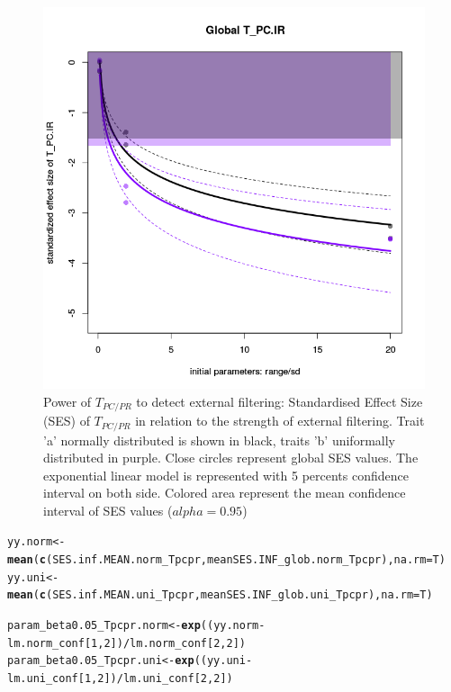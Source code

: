 \documentclass[12pt]{article}\usepackage[]{graphicx}\usepackage[]{color}
\makeatletter
\def\maxwidth{ %
  \ifdim\Gin@nat@width>\linewidth
    \linewidth
  \else
    \Gin@nat@width
  \fi
}
\newcommand{\hlnum}[1]{\textcolor[rgb]{0.686,0.059,0.569}{#1}}%
\newcommand{\hlopt}[1]{\textcolor[rgb]{0,0,0}{#1}}%
\newcommand{\hlstd}[1]{\textcolor[rgb]{0.345,0.345,0.345}{#1}}%
\newcommand{\hlkwb}[1]{\textcolor[rgb]{0.69,0.353,0.396}{#1}}%
\newcommand{\hlkwc}[1]{\textcolor[rgb]{0.333,0.667,0.333}{#1}}%
\newcommand{\hlkwd}[1]{\textcolor[rgb]{0.737,0.353,0.396}{\textbf{#1}}}%
\newenvironment{kframe}{%
 \def\at@end@of@kframe{}%
 \ifinner\ifhmode%
  \def\at@end@of@kframe{\end{minipage}}%
  \begin{minipage}{\columnwidth}%
 \fi\fi%
 \def\FrameCommand##1{\hskip\@totalleftmargin \hskip-\fboxsep
 \colorbox{shadecolor}{##1}\hskip-\fboxsep
     \hskip-\linewidth \hskip-\@totalleftmargin \hskip\columnwidth}%
 \MakeFramed {\advance\hsize-\width
   \@totalleftmargin\z@ \linewidth\hsize
   \@setminipage}}%
 {\par\unskip\endMakeFramed%
 \at@end@of@kframe}
\newenvironment{knitrout}{}{} %
\makeatother
\begin{document}
\begin{knitrout}
\begin{figure}
{\centering \includegraphics[width=\maxwidth]{figure/Ex_conc_plot2-1} 

}

\caption[Power of $T_{PC/PR}$ to detect external filtering]{Power of $T_{PC/PR}$ to detect external filtering: Standardised Effect Size (SES) of $T_{PC/PR}$ in relation to the strength of external filtering. Trait 'a' normally distributed is shown in black, traits 'b' uniformally distributed in purple. Close circles represent global SES values. The exponential linear model is represented with 5 percents confidence interval on both side. Colored area represent the mean confidence interval of SES values ($alpha = 0.95$)}\label{fig:Ex_conc_plot2}
\end{figure}


\end{knitrout}

\begin{knitrout}\small
{}\color{fgcolor}\begin{kframe}
\begin{alltt}
\hlstd{yy.norm} \hlkwb{<-} \hlkwd{mean}\hlstd{(}\hlkwd{c}\hlstd{(SES.inf.MEAN.norm_Tpcpr, meanSES.INF_glob.norm_Tpcpr),} \hlkwc{na.rm} \hlstd{= T)}
\hlstd{yy.uni} \hlkwb{<-} \hlkwd{mean}\hlstd{(}\hlkwd{c}\hlstd{(SES.inf.MEAN.uni_Tpcpr, meanSES.INF_glob.uni_Tpcpr),} \hlkwc{na.rm} \hlstd{= T)}

\hlstd{param_beta0.05_Tpcpr.norm} \hlkwb{<-} \hlkwd{exp}\hlstd{( (yy.norm} \hlopt{-} \hlstd{lm.norm_conf [}\hlnum{1}\hlstd{,} \hlnum{2}\hlstd{])} \hlopt{/} \hlstd{lm.norm_conf [}\hlnum{2}\hlstd{,} \hlnum{2}\hlstd{] )}
\hlstd{param_beta0.05_Tpcpr.uni} \hlkwb{<-} \hlkwd{exp}\hlstd{( (yy.uni} \hlopt{-} \hlstd{lm.uni_conf [}\hlnum{1}\hlstd{,} \hlnum{2}\hlstd{])} \hlopt{/} \hlstd{lm.uni_conf [}\hlnum{2}\hlstd{,} \hlnum{2}\hlstd{] )}
\end{alltt}
\end{kframe}
\end{knitrout}
\end{document}
